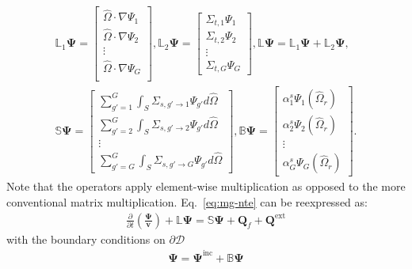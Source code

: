 \begin{gather}
  \mathbb{L}_1\bm{\Psi} =
  \begin{bmatrix}
    \hat{\Omega}\cdot\nabla\Psi_1 \\
    \hat{\Omega}\cdot\nabla\Psi_2 \\
    \vdots \\
    \hat{\Omega}\cdot\nabla\Psi_G \\
  \end{bmatrix},
  \mathbb{L}_2\bm{\Psi} =
  \begin{bmatrix}
    \Sigma_{t,1}\Psi_1 \\
    \Sigma_{t,2}\Psi_2 \\
    \vdots \\
    \Sigma_{t,G}\Psi_G
  \end{bmatrix},
  \mathbb{L}\bm{\Psi} = \mathbb{L}_1\bm{\Psi} + \mathbb{L}_2\bm{\Psi}, \nonumber \\
  \mathbb{S}\bm{\Psi} =
  \begin{bmatrix}
    \sum^G_{g'=1}\int_S \Sigma_{s,g'\rightarrow 1}\Psi_{g'}d\hat{\Omega} \\
    \sum^G_{g'=2}\int_S \Sigma_{s,g'\rightarrow 2}\Psi_{g'}d\hat{\Omega} \\
    \vdots \\
    \sum^G_{g'=G}\int_S \Sigma_{s,g'\rightarrow G}\Psi_{g'}d\hat{\Omega}
  \end{bmatrix},
  \mathbb{B}\bm{\Psi} =
  \begin{bmatrix}
    \alpha^s_1\Psi_1(\hat{\Omega}_r) \\
    \alpha^s_2\Psi_2(\hat{\Omega}_r) \\
    \vdots \\
    \alpha^s_G\Psi_G(\hat{\Omega}_r)
  \end{bmatrix}. \nonumber
\end{gather}
%
Note that the operators apply element-wise multiplication as opposed to the more conventional
matrix multiplication. Eq.\ \ref{eq:mg-nte} can be reexpressed as:
%
\begin{gather}
  \frac{\partial}{\partial t} \left(\frac{\bm{\Psi}}{\bm{v}}\right)+\mathbb{L}\bm{\Psi}
  = \mathbb{S}\bm{\Psi} + \bm{Q}_f + \bm{Q}^\text{ext} \label{eq:nte-vec}
\end{gather}
%
with the boundary conditions on $\partial\mathcal{D}$
%
\begin{gather}
  \bm{\Psi} = \bm{\Psi}^\text{inc} + \mathbb{B}\bm{\Psi}
\end{gather}


